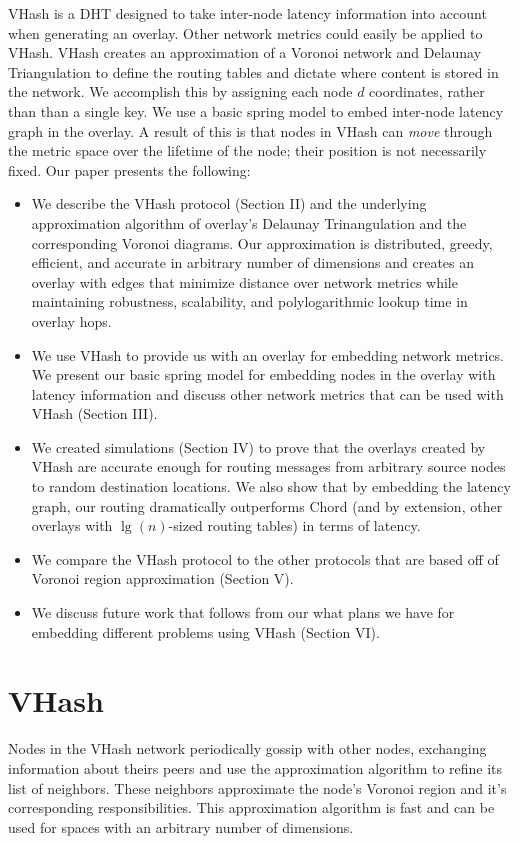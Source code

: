 \documentclass{IEEEtran}
\begin{document}
VHash is a DHT designed to take inter-node latency information into account when generating an overlay.
Other network metrics could easily be applied to VHash.
VHash creates an approximation of a Voronoi network and Delaunay Triangulation to define the routing tables and dictate where content is stored in the network.
We accomplish this by assigning each node $d$ coordinates, rather than than a single key.
We use a basic spring model to embed inter-node latency graph in the overlay.
A result of this is that nodes in VHash  can \emph{move} through the metric space over the lifetime of the node;  their position is not necessarily fixed.
Our paper presents the following:

\begin{itemize}
	\item We describe the VHash protocol (Section II) and the underlying approximation algorithm of overlay's Delaunay Trinangulation and the corresponding Voronoi diagrams.
    Our approximation is distributed, greedy, efficient, and accurate in arbitrary number of dimensions and creates an overlay with edges that minimize distance over network metrics while maintaining robustness, scalability, and polylogarithmic lookup time in overlay hops.
	\item We use VHash to provide us with an overlay for embedding network metrics.
    We present our basic spring model for embedding nodes in the overlay with latency information and discuss other network metrics that can be used with VHash (Section III).
	\item We created simulations (Section IV) to prove that the overlays created by VHash are accurate enough for routing messages from arbitrary source nodes to random destination locations.
    We also show that by embedding the latency graph, our routing dramatically outperforms Chord (and by extension, other overlays with $\lg(n)$-sized routing tables) in terms of latency.
	\item We compare the VHash protocol to the other protocols that are based off of Voronoi region approximation (Section V).
	\item We discuss future work that follows from our what plans we have for embedding different problems using VHash (Section VI).
\end{itemize}


\section{VHash}
Nodes in the VHash network periodically gossip with other nodes, exchanging information about theirs peers and use the approximation algorithm to refine its list of neighbors.
These neighbors approximate the node's Voronoi region and it's corresponding responsibilities.
This approximation algorithm is fast and can be used for spaces with an arbitrary number of dimensions.
\end{document}
